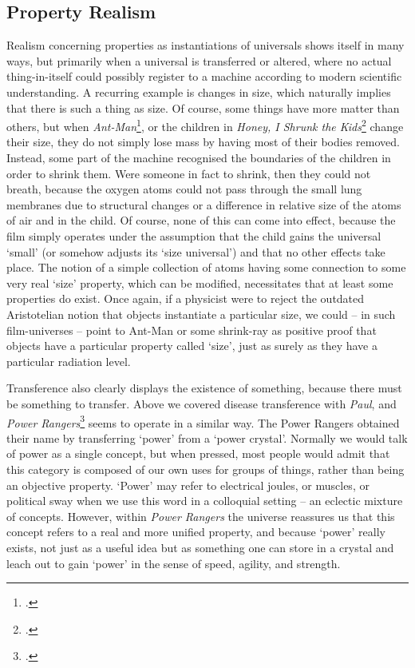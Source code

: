 \documentclass{article}
\begin{document}
\subsection{Property Realism}
Realism concerning properties as instantiations of universals shows itself in many ways, but primarily when a universal is transferred or altered, where no actual thing-in-itself could possibly register to a machine according to modern scientific understanding. A recurring example is changes in size, which naturally implies that there is such a thing as size. Of course, some things have more matter than others, but when \textit{Ant-Man}\footcite{ant-man}, or the children in \textit{Honey, I Shrunk the Kids}\footcite{honeyishrunkthekids} change their size, they do not simply lose mass by having most of their bodies removed. Instead, some part of the machine recognised the boundaries of the children in order to shrink them. Were someone in fact to shrink, then they could not breath, because the oxygen atoms could not pass through the small lung membranes due to structural changes or a difference in relative size of the atoms of air and in the child. Of course, none of this can come into effect, because the film simply operates under the assumption that the child gains the universal `small' (or somehow adjusts its `size universal') and that no other effects take place. The notion of a simple collection of atoms having some connection to some very real `size' property, which can be modified, necessitates that at least some properties do exist. Once again, if a physicist were to reject the outdated Aristotelian notion that objects instantiate a particular size, we could -- in such film-universes -- point to Ant-Man or some shrink-ray as positive proof that objects have a particular property called `size', just as surely as they have a particular radiation level.

Transference also clearly displays the existence of something, because there must be something to transfer. Above we covered disease transference with \textit{Paul}, and \textit{Power Rangers}\footcite{powerrangers} seems to operate in a similar way. The Power Rangers obtained their name by transferring `power' from a `power crystal'. Normally we would talk of power as a single concept, but when pressed, most people would admit that this category is composed of our own uses for groups of things, rather than being an objective property. `Power' may refer to electrical joules, or muscles, or political sway when we use this word in a colloquial setting -- an eclectic mixture of concepts. However, within \textit{Power Rangers} the universe reassures us that this concept refers to a real and more unified property, and because `power' really exists, not just as a useful idea but as something one can store in a crystal and leach out to gain `power' in the sense of speed, agility, and strength.
\end{document}
